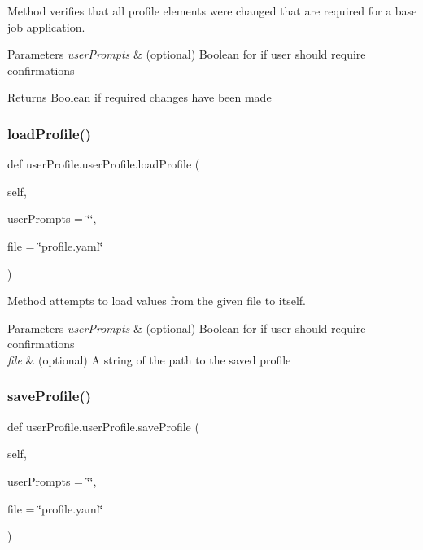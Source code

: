 Method verifies that all profile elements were changed that are required for a base job application. 


\begin{DoxyParams}{Parameters}
{\em user\+Prompts} & (optional) Boolean for if user should require confirmations \\
\hline
\end{DoxyParams}
\begin{DoxyReturn}{Returns}
Boolean if required changes have been made 
\end{DoxyReturn}
\mbox{\label{classuserProfile_1_1userProfile_a7243a67eaec172d035828f95779b9534}} 
\subsubsection{\texorpdfstring{load\+Profile()}{loadProfile()}}
{\footnotesize\ttfamily def user\+Profile.\+user\+Profile.\+load\+Profile (\begin{DoxyParamCaption}\item[{}]{self,  }\item[{}]{user\+Prompts = {\ttfamily \char`\"{}\char`\"{}},  }\item[{}]{file = {\ttfamily \char`\"{}profile.yaml\char`\"{}} }\end{DoxyParamCaption})}



Method attempts to load values from the given file to itself. 


\begin{DoxyParams}{Parameters}
{\em user\+Prompts} & (optional) Boolean for if user should require confirmations \\
\hline
{\em file} & (optional) A string of the path to the saved profile \\
\hline
\end{DoxyParams}
\mbox{\label{classuserProfile_1_1userProfile_aabe8e582214f44b0315fee65fb97a5a3}} 
\subsubsection{\texorpdfstring{save\+Profile()}{saveProfile()}}
{\footnotesize\ttfamily def user\+Profile.\+user\+Profile.\+save\+Profile (\begin{DoxyParamCaption}\item[{}]{self,  }\item[{}]{user\+Prompts = {\ttfamily \char`\"{}\char`\"{}},  }\item[{}]{file = {\ttfamily \char`\"{}profile.yaml\char`\"{}} }\end{DoxyParamCaption})}



